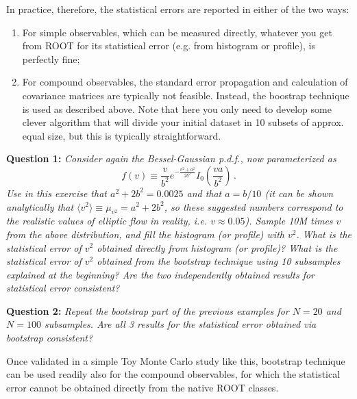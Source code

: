 \documentclass[11pt]{article}
\begin{document}
In practice, therefore, the statistical errors are reported in either of the two ways:
%
\begin{enumerate}
\item For simple observables, which can be measured directly, whatever you get from ROOT for its statistical error (e.g. from histogram or profile), is perfectly fine;
%
\item For compound observables, the standard error propagation and calculation of covariance matrices are typically not feasible. Instead, the boostrap technique is used as described above. Note that here you only need to develop some clever algorithm that will divide your initial dataset in 10 subsets of approx. equal size, but this is typically straightforward. 
\end{enumerate}

\bigskip

\noindent\textbf{Question 1:} {\it Consider again the Bessel-Gaussian p.d.f., now parameterized as
%
\begin{equation}
f(v)\equiv\frac{v}{b^2}e^{-\frac{v^2+a^2}{2b^2}}I_0(\frac{va}{b^2})\,.
\label{eq:BesselGaussianPDF}
\end{equation}
%
Use in this exercise that $a^2 + 2b^2 = 0.0025$ and that $a=b/10$ (it can be shown analytically that $\langle v^2\rangle \equiv \mu_{v^2} = a^2 + 2b^2$, so these suggested numbers correspond to the realistic values of elliptic flow in reality, i.e. $v \approx 0.05$). Sample 10M times $v$ from the above distribution, and fill the histogram (or profile) with $v^2$. What is the statistical error of $v^2$ obtained directly from histogram (or profile)? What is the statistical error of $v^2$ obtained from the bootstrap technique using 10 subsamples explained at the beginning? Are the two independently obtained results for statistical error consistent?}

\bigskip

\noindent\textbf{Question 2:} {\it Repeat the bootstrap part of the previous examples for $N = 20$ and $N = 100$ subsamples. Are all 3 results for the statistical error obtained via bootstrap consistent?}
	
\bigskip	
	
Once validated in a simple Toy Monte Carlo study like this, bootstrap technique can be used readily also for the compound observables, for which the statistical error cannot be obtained directly from the native ROOT classes.
\end{document}
